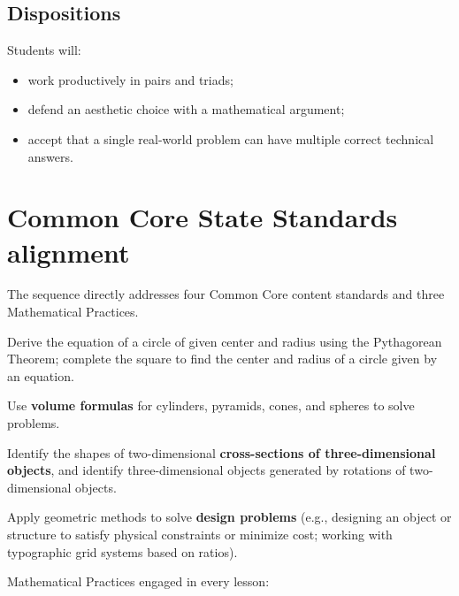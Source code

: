 \documentclass[12pt,letterpaper]{scrartcl}
\newcommand{\acc}[1]{\textcolor{accent}{\textbf{#1}}}
\begin{document}
\subsection{Dispositions}

Students will:

\begin{itemize}[leftmargin=1.3em,itemsep=0.15em,topsep=0.3em]
  \item work productively in pairs and triads;
  \item defend an aesthetic choice with a mathematical argument;
  \item accept that a single real-world problem can have multiple correct technical answers.
\end{itemize}

\section{Common Core State Standards alignment}

The sequence directly addresses four Common Core content standards and three Mathematical Practices.

\begin{standard}
Derive the equation of a circle of given center and radius using the Pythagorean Theorem; complete the square to find the center and radius of a circle given by an equation.
\end{standard}

\begin{standard}
Use \acc{volume formulas} for cylinders, pyramids, cones, and spheres to solve problems.
\end{standard}

\begin{standard}
Identify the shapes of two-dimensional \acc{cross-sections of three-dimensional objects}, and identify three-dimensional objects generated by rotations of two-dimensional objects.
\end{standard}

\begin{standard}[HSG.MG.A.3]
Apply geometric methods to solve \acc{design problems} (e.g., designing an object or structure to satisfy physical constraints or minimize cost; working with typographic grid systems based on ratios).
\end{standard}

\medskip
Mathematical Practices engaged in every lesson:
\end{document}
